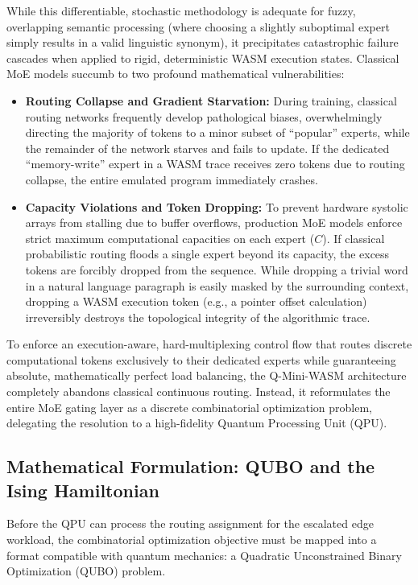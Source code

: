 \documentclass[11pt,a4paper]{article}
\begin{document}
While this differentiable, stochastic methodology is adequate for fuzzy, overlapping semantic processing (where choosing a slightly suboptimal expert simply results in a valid linguistic synonym), it precipitates catastrophic failure cascades when applied to rigid, deterministic WASM execution states. Classical MoE models succumb to two profound mathematical vulnerabilities:

\begin{itemize}
    \item \textbf{Routing Collapse and Gradient Starvation:} During training, classical routing networks frequently develop pathological biases, overwhelmingly directing the majority of tokens to a minor subset of ``popular'' experts, while the remainder of the network starves and fails to update. If the dedicated ``memory-write'' expert in a WASM trace receives zero tokens due to routing collapse, the entire emulated program immediately crashes.
    \item \textbf{Capacity Violations and Token Dropping:} To prevent hardware systolic arrays from stalling due to buffer overflows, production MoE models enforce strict maximum computational capacities on each expert ($C$). If classical probabilistic routing floods a single expert beyond its capacity, the excess tokens are forcibly dropped from the sequence. While dropping a trivial word in a natural language paragraph is easily masked by the surrounding context, dropping a WASM execution token (e.g., a pointer offset calculation) irreversibly destroys the topological integrity of the algorithmic trace.
\end{itemize}

To enforce an execution-aware, hard-multiplexing control flow that routes discrete computational tokens exclusively to their dedicated experts while guaranteeing absolute, mathematically perfect load balancing, the Q-Mini-WASM architecture completely abandons classical continuous routing. Instead, it reformulates the entire MoE gating layer as a discrete combinatorial optimization problem, delegating the resolution to a high-fidelity Quantum Processing Unit (QPU).

\subsection{Mathematical Formulation: QUBO and the Ising Hamiltonian}

Before the QPU can process the routing assignment for the escalated edge workload, the combinatorial optimization objective must be mapped into a format compatible with quantum mechanics: a Quadratic Unconstrained Binary Optimization (QUBO) problem.
\end{document}
